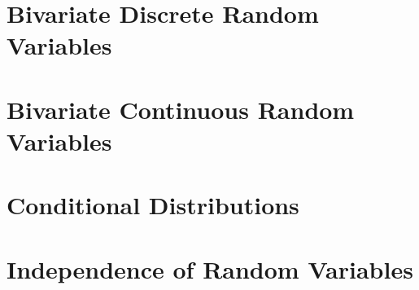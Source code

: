 \section{Bivariate Discrete Random Variables}

\section{Bivariate Continuous Random Variables}

\section{Conditional Distributions}

\section{Independence of Random Variables}

